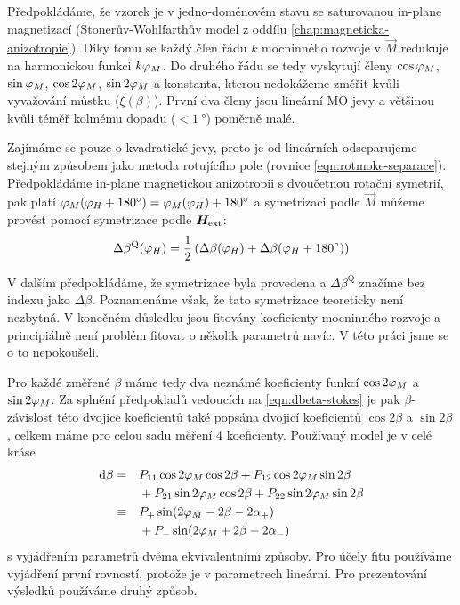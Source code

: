 Předpokládáme, že vzorek je v jedno-doménovém stavu se saturovanou in-plane magnetizací (Stonerův-Wohlfarthův model z oddílu \ref{chap:magneticka-anizotropie}).
Díky tomu se každý člen řádu $k$ mocninného rozvoje v $\vec{M}$ redukuje na harmonickou funkci $k\varphi_M$.
Do druhého řádu se tedy vyskytují členy $\cos\varphi_M$, $\sin\varphi_M$, $\cos2\varphi_M$, $\sin2\varphi_M$ a konstanta, kterou nedokážeme změřit kvůli vyvažování můstku ($\xi(\beta)$).
První dva členy jsou lineární MO jevy a většinou kvůli téměř kolmému dopadu ($< \SI{1}{\degree}$) poměrně malé.

Zajímáme se pouze o kvadratické jevy, proto je od lineárních odseparujeme stejným způsobem jako metoda rotujícího pole (rovnice \eqref{eqn:rotmoke-separace}).
Předpokládáme in-plane magnetickou anizotropii s dvoučetnou rotační symetrií, pak platí $\varphi_M(\varphi_H+\SI{180}{\degree})=\varphi_M(\varphi_H)+\SI{180}{\degree}$ a symetrizaci podle $\vec{M}$ můžeme provést pomocí symetrizace podle $\bm{H}_\textrm{ext}$:
\begin{equation}
    \label{eqn:symetrizace-H}
    \Delta\beta^\textrm{Q}(\varphi_H) = \frac{1}{2}\left(\Delta\beta(\varphi_H) + \Delta\beta(\varphi_H+\SI{180}{\degree})\right)
\end{equation}

V dalším předpokládáme, že symetrizace byla provedena a $\Delta\beta^\textrm{Q}$ značíme bez indexu jako $\Delta\beta$.
Poznamenáme však, že tato symetrizace teoreticky není nezbytná.
V konečném důsledku jsou fitovány koeficienty mocninného rozvoje a principiálně není problém fitovat o několik parametrů navíc.
V této práci jsme se o to nepokoušeli.

Pro každé změřené $\beta$ máme tedy dva neznámé koeficienty funkcí $\cos2\varphi_M$ a $\sin2\varphi_M$.
Za splnění předpokladů vedoucích na \eqref{eqn:dbeta-stokes} je pak $\beta$-závislost této dvojice koeficientů také popsána dvojicí koeficientů $\cos2\beta$ a $\sin2\beta$, celkem máme pro celou sadu měření 4 koeficienty.
Používaný model je v celé kráse
\begin{alignat}{2}
    \label{eqn:PMLD-matice}
    \textrm{d}\beta &= && P_{11} \cos2\varphi_M\cos2\beta + P_{12}\cos2\varphi_M\sin2\beta \\
                    & && + P_{21}\sin2\varphi_M\cos2\beta + P_{22}\sin2\varphi_M\sin2\beta \\
                    &\equiv & & P_+ \sin(2\varphi_M - 2\beta - 2\alpha_+) \\
                    &  & & + P_- \sin(2\varphi_M + 2\beta - 2\alpha_-)
\end{alignat}
s vyjádřením parametrů dvěma ekvivalentními způsoby.
Pro účely fitu používáme vyjádření první rovností, protože je v parametrech lineární.
Pro prezentování výsledků používáme druhý způsob.

